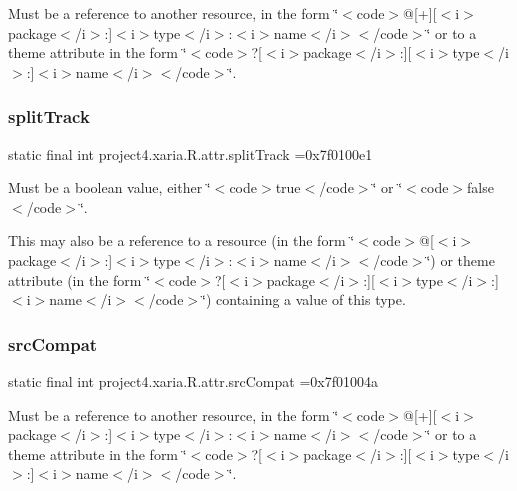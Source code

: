 Must be a reference to another resource, in the form \char`\"{}$<$code$>$@\mbox{[}+\mbox{]}\mbox{[}$<$i$>$package$<$/i$>$\+:\mbox{]}$<$i$>$type$<$/i$>$\+:$<$i$>$name$<$/i$>$$<$/code$>$\char`\"{} or to a theme attribute in the form \char`\"{}$<$code$>$?\mbox{[}$<$i$>$package$<$/i$>$\+:\mbox{]}\mbox{[}$<$i$>$type$<$/i$>$\+:\mbox{]}$<$i$>$name$<$/i$>$$<$/code$>$\char`\"{}. \mbox{\label{classproject4_1_1xaria_1_1R_1_1attr_a7c3388ed165d038075d0fad48083db41}} 
\subsubsection{\texorpdfstring{split\+Track}{splitTrack}}
{\footnotesize\ttfamily static final int project4.\+xaria.\+R.\+attr.\+split\+Track =0x7f0100e1\hspace{0.3cm}{\ttfamily [static]}}

Must be a boolean value, either \char`\"{}$<$code$>$true$<$/code$>$\char`\"{} or \char`\"{}$<$code$>$false$<$/code$>$\char`\"{}. 

This may also be a reference to a resource (in the form \char`\"{}$<$code$>$@\mbox{[}$<$i$>$package$<$/i$>$\+:\mbox{]}$<$i$>$type$<$/i$>$\+:$<$i$>$name$<$/i$>$$<$/code$>$\char`\"{}) or theme attribute (in the form \char`\"{}$<$code$>$?\mbox{[}$<$i$>$package$<$/i$>$\+:\mbox{]}\mbox{[}$<$i$>$type$<$/i$>$\+:\mbox{]}$<$i$>$name$<$/i$>$$<$/code$>$\char`\"{}) containing a value of this type. \mbox{\label{classproject4_1_1xaria_1_1R_1_1attr_aaaf0f9e139982ba4a4b3100d2f1d9b53}} 
\subsubsection{\texorpdfstring{src\+Compat}{srcCompat}}
{\footnotesize\ttfamily static final int project4.\+xaria.\+R.\+attr.\+src\+Compat =0x7f01004a\hspace{0.3cm}{\ttfamily [static]}}

Must be a reference to another resource, in the form \char`\"{}$<$code$>$@\mbox{[}+\mbox{]}\mbox{[}$<$i$>$package$<$/i$>$\+:\mbox{]}$<$i$>$type$<$/i$>$\+:$<$i$>$name$<$/i$>$$<$/code$>$\char`\"{} or to a theme attribute in the form \char`\"{}$<$code$>$?\mbox{[}$<$i$>$package$<$/i$>$\+:\mbox{]}\mbox{[}$<$i$>$type$<$/i$>$\+:\mbox{]}$<$i$>$name$<$/i$>$$<$/code$>$\char`\"{}. \mbox{\label{classproject4_1_1xaria_1_1R_1_1attr_a093289194d9cb73a8e247eb80a312f0b}} 
